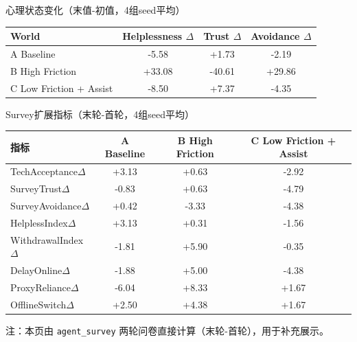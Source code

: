 \documentclass[aspectratio=169]{beamer}
\begin{document}
\begin{frame}{心理状态变化（末值-初值，4组seed平均）}
    \begin{center}
        \small
        \begin{tabular}{lccc}
            \toprule
            World & Helplessness \(\Delta\) & Trust \(\Delta\) & Avoidance \(\Delta\) \\
            \midrule
            A Baseline & -5.58 & +1.73 & -2.19 \\
            B High Friction & +33.08 & -40.61 & +29.86 \\
            C Low Friction + Assist & -8.50 & +7.37 & -4.35 \\
            \bottomrule
        \end{tabular}
    \end{center}
    \vspace{0.2cm}

\end{frame}

\begin{frame}{Survey扩展指标（末轮-首轮，4组seed平均）}
    \begin{center}
        \scriptsize
        \begin{tabular}{lccc}
            \toprule
            指标 & A Baseline & B High Friction & C Low Friction + Assist \\
            \midrule
            TechAcceptance\(\Delta\) & +3.13 & +0.63 & -2.92 \\
            SurveyTrust\(\Delta\) & -0.83 & +0.63 & -4.79 \\
            SurveyAvoidance\(\Delta\) & +0.42 & -3.33 & -4.38 \\
            HelplessIndex\(\Delta\) & +3.13 & +0.31 & -1.56 \\
            WithdrawalIndex\(\Delta\) & -1.81 & +5.90 & -0.35 \\
            DelayOnline\(\Delta\) & -1.88 & +5.00 & -4.38 \\
            ProxyReliance\(\Delta\) & -6.04 & +8.33 & +1.67 \\
            OfflineSwitch\(\Delta\) & +2.50 & +4.38 & +1.67 \\
            \bottomrule
        \end{tabular}
    \end{center}
    \vspace{0.15cm}
    \tiny 注：本页由 \texttt{agent\_survey} 两轮问卷直接计算（末轮-首轮），用于补充展示。
\end{frame}
\end{document}

